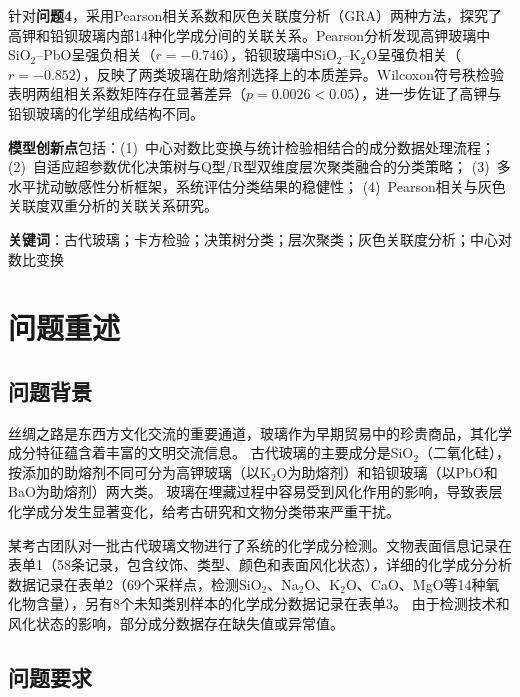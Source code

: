 \documentclass[12pt,a4paper]{ctexart}
\begin{document}
针对\textbf{问题4}，采用Pearson相关系数和灰色关联度分析（GRA）两种方法，探究了高钾和铅钡玻璃内部14种化学成分间的关联关系。Pearson分析发现高钾玻璃中SiO$_2$--PbO呈强负相关（$r=-0.746$），铅钡玻璃中SiO$_2$--K$_2$O呈强负相关（$r=-0.852$），反映了两类玻璃在助熔剂选择上的本质差异。Wilcoxon符号秩检验表明两组相关系数矩阵存在显著差异（$p=0.0026<0.05$），进一步佐证了高钾与铅钡玻璃的化学组成结构不同。

\textbf{模型创新点}包括：(1)~中心对数比变换与统计检验相结合的成分数据处理流程；
(2)~自适应超参数优化决策树与Q型/R型双维度层次聚类融合的分类策略；
(3)~多水平扰动敏感性分析框架，系统评估分类结果的稳健性；
(4)~Pearson相关与灰色关联度双重分析的关联关系研究。

\begin{flushright}
    \textbf{关键词}：古代玻璃；卡方检验；决策树分类；层次聚类；灰色关联度分析；中心对数比变换
\end{flushright}

\newpage

\section{问题重述}

\subsection{问题背景}

丝绸之路是东西方文化交流的重要通道，玻璃作为早期贸易中的珍贵商品，其化学成分特征蕴含着丰富的文明交流信息。
古代玻璃的主要成分是SiO$_2$（二氧化硅），按添加的助熔剂不同可分为高钾玻璃（以K$_2$O为助熔剂）和铅钡玻璃（以PbO和BaO为助熔剂）两大类\cite{1}。
玻璃在埋藏过程中容易受到风化作用的影响，导致表层化学成分发生显著变化，给考古研究和文物分类带来严重干扰。

某考古团队对一批古代玻璃文物进行了系统的化学成分检测。文物表面信息记录在表单1（58条记录，包含纹饰、类型、颜色和表面风化状态），详细的化学成分分析数据记录在表单2（69个采样点，检测SiO$_2$、Na$_2$O、K$_2$O、CaO、MgO等14种氧化物含量），另有8个未知类别样本的化学成分数据记录在表单3。
由于检测技术和风化状态的影响，部分成分数据存在缺失值或异常值。

\subsection{问题要求}
\end{document}
